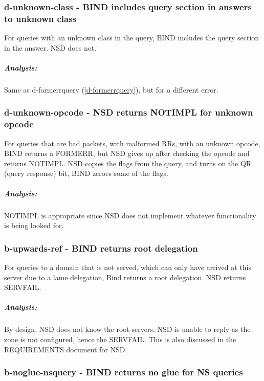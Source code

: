 \documentclass[twoside,titlepage,english]{nlnetlabs}
\begin{document}
\subsubsection{d-unknown-class - BIND includes query section in answers to unknown class}
\label{d-unknown-class}

For queries with an unknown class in the query, BIND includes the query section
in the answer. NSD does not.

\vspace{-8pt}\subparagraph{Analysis:}

Same as d-formerrquery (\ref{d-formerrquery}), but for a different error.


\subsubsection{d-unknown-opcode - NSD returns NOTIMPL for unknown opcode}
\label{d-unknown-opcode}

For queries that are bad packets, with malformed RRs, with an unknown opcode,
BIND returns a FORMERR, but NSD gives up after checking the opcode and
returns NOTIMPL.  NSD copies the flags from the query, and turns on the 
QR (query response) bit, BIND zeroes some of the flags.

\vspace{-8pt}\subparagraph{Analysis:}

NOTIMPL is appropriate since NSD does not implement whatever functionality
is being looked for. 


\subsubsection{b-upwards-ref - BIND returns root delegation}
\label{b-upwards-ref}

For queries to a domain that is not served, which can only have arrived at
this server due to a lame delegation, Bind returns a root delegation. NSD
returns SERVFAIL.

\vspace{-8pt}\subparagraph{Analysis:}

By design, NSD does not know the root-servers.  NSD is unable to reply as
the zone is not configured, hence the SERVFAIL. This is also discussed in
the REQUIREMENTS document for NSD.


\subsubsection{b-noglue-nsquery - BIND returns no glue for NS queries}
\label{b-noglue-nsquery}
\end{document}
